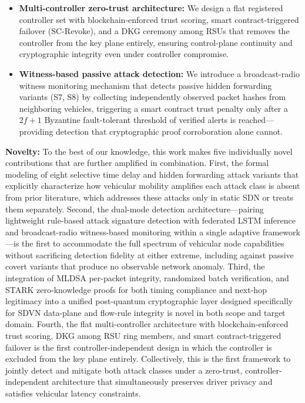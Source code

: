 \documentclass[12pt, a4paper]{report}
\begin{document}
\begin{itemize}
    \item \textbf{Multi-controller zero-trust architecture:}
We design a flat registered controller set with
blockchain-enforced trust scoring, smart
contract-triggered failover (SC-Revoke), and a
\ac{DKG} ceremony among \ac{RSU}s that removes the
controller from the key plane entirely, ensuring
control-plane continuity and cryptographic integrity
even under controller compromise.

\item \textbf{Witness-based passive attack detection:}
We introduce a broadcast-radio witness monitoring
mechanism that detects passive hidden forwarding
variants (S7, S8) by collecting independently
observed packet hashes from neighboring vehicles,
triggering a smart contract trust penalty only after
a $2f{+}1$ Byzantine fault-tolerant threshold of
verified alerts is reached---providing detection that
cryptographic proof corroboration alone cannot.

\end{itemize}


\textbf{Novelty:}
To the best of our knowledge, this work makes five
individually novel contributions that are further
amplified in combination.
First, the formal modeling of eight selective time
delay and hidden forwarding attack variants that
explicitly characterize how vehicular mobility
amplifies each attack class is absent from prior
literature, which addresses these attacks only in
static SDN or treats them separately.
Second, the dual-mode detection architecture---pairing
lightweight rule-based attack signature detection with
federated LSTM inference and broadcast-radio
witness-based monitoring within a single adaptive
framework---is the first to accommodate the full
spectrum of vehicular node capabilities without
sacrificing detection fidelity at either extreme,
including against passive covert variants that produce
no observable network anomaly.
Third, the integration of \ac{MLDSA} per-packet
integrity, randomized batch verification, and \ac{STARK}
zero-knowledge proofs for both timing compliance and
next-hop legitimacy into a unified post-quantum
cryptographic layer designed specifically for \ac{SDVN}
data-plane and flow-rule integrity is novel in both
scope and target domain.
Fourth, the flat multi-controller architecture with
blockchain-enforced trust scoring, \ac{DKG} among
\ac{RSU} ring members, and smart contract-triggered
failover is the first controller-independent design
in which the controller is excluded from the key
plane entirely.
Collectively, this is the first framework to jointly
detect and mitigate both attack classes under a
zero-trust, controller-independent architecture that
simultaneously preserves driver privacy and satisfies
vehicular latency constraints.
\end{document}
